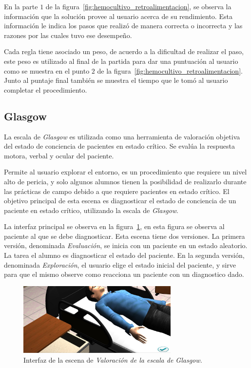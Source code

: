 En la parte $1$ de la figura~\ref{fig:hemocultivo_retroalimentacion}, se observa
la información que la solución provee al usuario acerca de su rendimiento. Esta
información le indica los pasos que realizó de manera correcta o incorrecta y
las razones por las cuales tuvo ese desempeño.

Cada regla tiene asociado un peso, de acuerdo a la dificultad de realizar el
paso, este peso es utilizado al final de la partida para dar una puntuación al
usuario como se muestra en el punto $2$ de la
figura~\ref{fig:hemocultivo_retroalimentacion}. Junto al puntaje final también
se muestra el tiempo que le tomó al usuario completar el procedimiento.

\subsection{Glasgow}

La escala de \textit{Glasgow} es utilizada como una herramienta de valoración objetiva
del estado de conciencia de pacientes en estado crítico. Se evalúa la respuesta
motora, verbal y ocular del paciente.

Permite al usuario explorar el entorno, es un procedimiento que requiere un
nivel alto de pericia, y solo algunos alumnos tienen la posibilidad de
realizarlo durante las prácticas de campo debido a que requiere pacientes en
estado crítico. El objetivo principal de esta escena es diagnosticar el estado
de conciencia de un paciente en estado crítico, utilizando la escala de
\textit{Glasgow}\cite{protocolo}. 

La interfaz principal se observa en la figura~\ref{fig:glasgow_principal}, en
esta figura se observa al paciente al que se debe diagnosticar. Esta escena
tiene dos versiones. La primera versión, denominada \emph{Evaluación}, se inicia
con un paciente en un estado aleatorio. La tarea el alumno es diagnosticar el
estado del paciente. En la segunda versión, denominada \emph{Exploración}, el
usuario elige el estado inicial del paciente, y sirve para que el mismo observe
como reacciona un paciente con un diagnostico dado.

\begin{figure}
\centering
\includegraphics[width=8cm]{../solucion/images/glasgow_principal.jpg}
\caption{Interfaz de la escena de \emph{Valoración de la escala de Glasgow.}}
\label{fig:glasgow_principal}
\end{figure}



